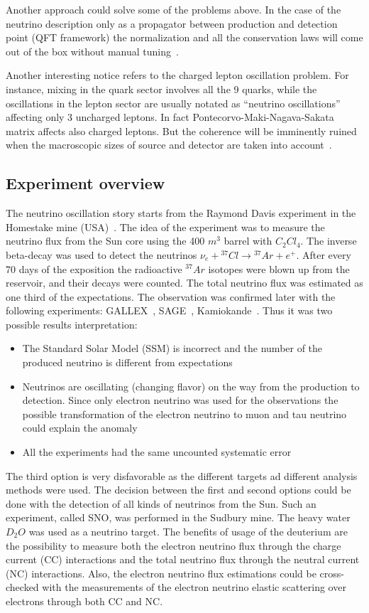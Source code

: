 \documentclass[../main.tex]{subfiles}
\begin{document}
Another approach could solve some of the problems above. In the case of the neutrino description only as a propagator between production and detection point (QFT framework) the normalization and all the conservation laws will come out of the box without manual tuning~\cite{Akhmedov2010a}.

Another interesting notice refers to the charged lepton oscillation problem. For instance, mixing in the quark sector involves all the 9 quarks, while the oscillations in the lepton sector are usually notated as ``neutrino oscillations'' affecting only 3 uncharged leptons. In fact Pontecorvo-Maki-Nagava-Sakata matrix affects also charged leptons. But the coherence will be imminently ruined when the macroscopic sizes of source and detector are taken into account~\cite{Akhmedov2007}.

\subsection{Experiment overview}
\label{sec:intro:osc_exp}
The neutrino oscillation story starts from the Raymond Davis experiment in the Homestake mine (USA)~\cite{Davis1968}. The idea of the experiment was to measure the neutrino flux from the Sun core using the 400 ${m^3}$ barrel with ${C_2Cl_4}$. The inverse beta-decay was used to detect the neutrinos $\nu_e+{}^{37}Cl\to{}^{37}Ar+e^+$. After every 70 days of the exposition the radioactive ${}^{37}Ar$ isotopes were blown up from the reservoir, and their decays were counted. The total neutrino flux was estimated as one third of the expectations. The observation was confirmed later with the following experiments: GALLEX~\cite{Kirsten1999}, SAGE~\cite{Abdurashitov1999}, Kamiokande~\cite{Oyama1989}. Thus it was two possible results interpretation:
\begin{itemize}
  \item The Standard Solar Model (SSM) is incorrect and the number of the produced neutrino is different from expectations
  \item Neutrinos are oscillating (changing flavor) on the way from the production to detection. Since only electron neutrino was used for the observations the possible transformation of the electron neutrino to muon and tau neutrino could explain the anomaly
  \item All the experiments had the same uncounted systematic error
\end{itemize}
The third option is very disfavorable as the different targets ad different analysis methods were used. The decision between the first and second options could be done with the detection of all kinds of neutrinos from the Sun. Such an experiment, called SNO, was performed in the Sudbury mine. The heavy water $D_2O$ was used as a neutrino target. The benefits of usage of the deuterium are the possibility to measure both the electron neutrino flux through the charge current (CC) interactions and the total neutrino flux through the neutral current (NC) interactions. Also, the electron neutrino flux estimations could be cross-checked with the measurements of the electron neutrino elastic scattering over electrons through both CC and NC.
\end{document}
